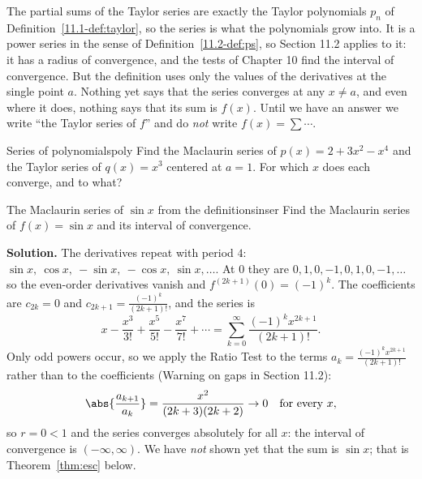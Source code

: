 \documentclass[11pt]{article}
\begin{document}
The partial sums of the Taylor series are exactly the Taylor polynomials $p_n$ of Definition~\ref{11.1-def:taylor}, so the series is what the polynomials grow into. It is a power series in the sense of Definition~\ref{11.2-def:ps}, so Section 11.2 applies to it: it has a radius of convergence, and the tests of Chapter 10 find the interval of convergence. But the definition uses only the values of the derivatives at the single point $a$. Nothing yet says that the series converges at any $x\ne a$, and even where it does, nothing says that its sum is $f(x)$. Until we have an answer we write ``the Taylor series of $f$'' and do \emph{not} write $f(x)=\sum\cdots$.

\begin{kc}{Series of polynomials}{poly}
Find the Maclaurin series of $p(x)=2+3x^2-x^4$ and the Taylor series of $q(x)=x^3$ centered at $a=1$. For which $x$ does each converge, and to what?
\end{kc}

\begin{exmp}{The Maclaurin series of $\sin x$ from the definition}{sinser}
Find the Maclaurin series of $f(x)=\sin x$ and its interval of convergence.

\textbf{Solution.} The derivatives repeat with period $4$: $\sin x,\ \cos x,\ -\sin x,\ -\cos x,\ \sin x,\dots$. At $0$ they are $0,1,0,-1,0,1,0,-1,\dots$
so the even-order derivatives vanish and $f^{(2k+1)}(0)=(-1)^k$. The coefficients are $c_{2k}=0$ and $c_{2k+1}=\frac{(-1)^k}{(2k+1)!}$, and the series is
\[
x-\frac{x^3}{3!}+\frac{x^5}{5!}-\frac{x^7}{7!}+\cdots=\sum_{k=0}^\infty\frac{(-1)^kx^{2k+1}}{(2k+1)!}.
\]
Only odd powers occur, so we apply the Ratio Test to the terms $a_k=\frac{(-1)^kx^{2k+1}}{(2k+1)!}$ rather than to the coefficients (Warning on gaps in Section 11.2):
\[
\abs{\frac{a_{k+1}}{a_k}}=\frac{x^2}{(2k+3)(2k+2)}\to0\quad\text{for every }x ,
\]
so $r=0<1$ and the series converges absolutely for all $x$: the interval of convergence is $(-\infty,\infty)$. We have \emph{not} shown yet that the sum is $\sin x$; that is Theorem~\ref{thm:esc} below.
\end{exmp}
\end{document}
